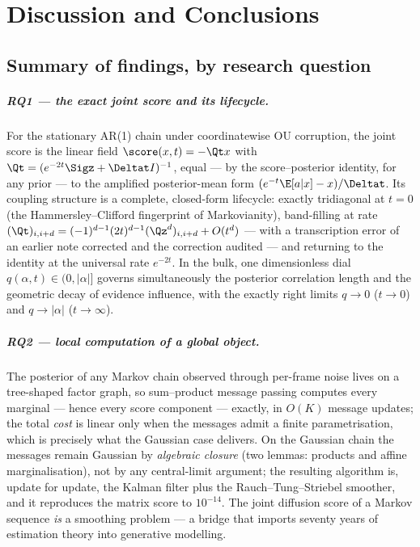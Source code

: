 \chapter{Discussion and Conclusions}\label{ch:conclusions}

\section{Summary of findings, by research question}

\paragraph{RQ1 --- the exact joint score and its lifecycle.} For the
stationary AR(1) chain under coordinatewise OU corruption, the joint score
is the linear field $\score(x,t) = -\Qt x$ with
$\Qt = (e^{-2t}\Sigz + \Deltat I)^{-1}$, equal --- by the score--posterior
identity, for any prior --- to the amplified posterior-mean form
$(e^{-t}\E[a|x] - x)/\Deltat$. Its coupling structure is a complete,
closed-form lifecycle: exactly tridiagonal at $t = 0$ (the
Hammersley--Clifford fingerprint of Markovianity), band-filling at rate
$(\Qt)_{i,i+d} = (-1)^{d-1}(2t)^{d-1}(\Qz^d)_{i,i+d} + O(t^d)$ --- with a
transcription error of an earlier note corrected and the correction
audited --- and returning to the identity at the universal rate $e^{-2t}$.
In the bulk, one dimensionless dial $q(\alpha, t) \in (0, |\alpha|]$
governs simultaneously the posterior correlation length and the geometric
decay of evidence influence, with the exactly right limits $q \to 0$
($t \to 0$) and $q \to |\alpha|$ ($t \to \infty$).

\paragraph{RQ2 --- local computation of a global object.} The posterior of
any Markov chain observed through per-frame noise lives on a tree-shaped
factor graph, so sum--product message passing computes every marginal ---
hence every score component --- exactly, in $O(K)$ message updates; the
total \emph{cost} is linear only when the messages admit a finite
parametrisation, which is precisely what the Gaussian case delivers. On
the Gaussian chain the messages remain Gaussian by \emph{algebraic
closure} (two lemmas:
products and affine marginalisation), not by any central-limit argument;
the resulting algorithm is, update for update, the Kalman filter plus the
Rauch--Tung--Striebel smoother, and it reproduces the matrix score to
$10^{-14}$. The joint diffusion score of a Markov sequence \emph{is} a
smoothing problem --- a bridge that imports seventy years of estimation
theory into generative modelling.

